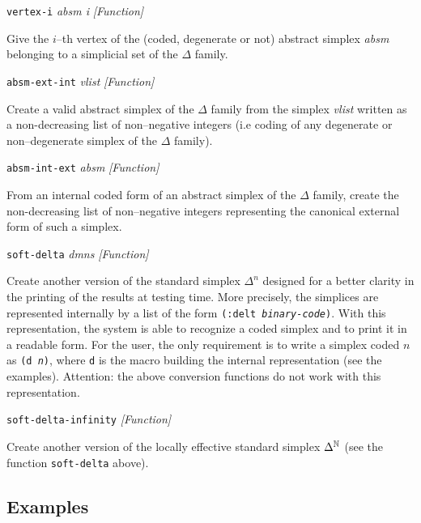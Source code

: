 \newpage
{\parindent=0mm
{\leftskip=5mm
{\tt vertex-i} {\em absm i} \hfill {\em [Function]}\par}
{\leftskip=15mm
Give the $i$--th vertex of the (coded, degenerate or not) abstract simplex {\em absm} belonging to a simplicial set
of the $\Delta$ family. \par}
{\leftskip=5mm
{\tt absm-ext-int} {\em vlist} \hfill {\em [Function]}\par}
{\leftskip=15mm
Create a valid abstract simplex of the $\Delta$ family from the simplex {\em vlist} written as a non-decreasing list of
non--negative integers (i.e coding of any degenerate or non--degenerate simplex of the $\Delta$ fa\-mi\-ly). \par}
{\leftskip=5mm
{\tt absm-int-ext} {\em absm} \hfill {\em [Function]}\par}
{\leftskip=15mm
From an internal coded form of an abstract simplex of the $\Delta$ family, create the  non-decreasing list
of non--negative integers representing the canonical external form of such a simplex. \par}
{\leftskip=5mm
{\tt soft-delta} {\em dmns} \hfill {\em [Function]} \par}
{\leftskip=15mm
Create another version of the standard simplex $\Delta^n$ designed for a better clarity in
the printing of the results at testing time. More precisely, the simplices are represented internally by a list
of the form {\tt (:delt {\em binary-code})}. With this representation, the system is able to
recognize a coded simplex and to print it in a readable form. For the user, the only
requirement is to write a simplex coded $n$ as {\tt (d {\em n})}, where {\tt d} is the macro
building the internal representation (see the examples). Attention: the above conversion
functions do not work with this representation. \par}
{\leftskip=5mm
{\tt soft-delta-infinity} \hfill {\em [Function]} \par}
{\leftskip=15mm
Create another version of the locally effective standard simplex $\Delta^{{\mathbb{N}}}$
(see the function {\tt soft-delta} above). \par}
}

\subsection* {Examples}

